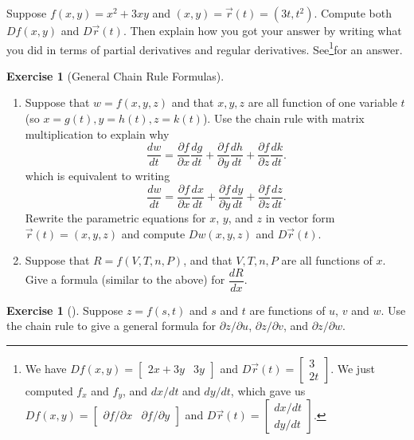 \documentclass[10pt,]{book}
\theoremstyle{plain}
\theoremstyle{definition}
\theoremstyle{definition}
\theoremstyle{definition}
\theoremstyle{definition}
\newtheorem{exploration}[project]{Exercise}
\theoremstyle{definition}
\numberwithin{equation}{section}
\newcommand{\amp}{&}
\begin{document}
Suppose \(f(x,y)=x^2+3xy\) and \((x,y) = \vec r(t) = (3t,t^2)\). Compute both \(Df(x,y)\) and \(D\vec r(t)\). Then explain how you got your answer by writing what you did in terms of partial derivatives and regular derivatives. See\footnote{We have \(Df(x,y) = \begin{bmatrix}2x+3y\amp 3y
\end{bmatrix}\) and \(D\vec r(t) = \begin{bmatrix}3\\2t
\end{bmatrix}\). We just computed \(f_x\) and \(f_y\), and \(dx/dt\) and \(dy/dt\), which gave us \(Df(x,y) = \begin{bmatrix}\partial f/\partial x\amp \partial f/\partial y
\end{bmatrix}\) and \(D\vec r(t) = \begin{bmatrix}dx/dt\\dy/dt
\end{bmatrix}\).\label{fn-4}}for an answer.%
\begin{exploration}[General Chain Rule Formulas]\label{exploration-157}
\leavevmode%
\begin{enumerate}[font=\bfseries,label=(\alph*),ref=\alph*]
\item\label{task-367} Suppose that \(w=f(x,y,z)\) and that \(x,y,z\) are all function of one variable \(t\) (so \(x=g(t), y=h(t), z=k(t)\)). Use the chain rule with matrix multiplication to explain why%
\begin{equation*}
\frac{dw}{dt} 
= \frac{\partial f}{\partial x}\frac{dg}{dt}+\frac{\partial f}{\partial y}\frac{dh}{dt}+\frac{\partial f}{\partial z}\frac{dk}{dt} 
.
\end{equation*}
which is equivalent to writing%
\begin{equation*}
\frac{dw}{dt} 
= \frac{\partial f}{\partial x}\frac{dx}{dt}+\frac{\partial f}{\partial y}\frac{dy}{dt}+\frac{\partial f}{\partial z}\frac{dz}{dt} 
.
\end{equation*}
Rewrite the parametric equations for \(x\), \(y\), and \(z\) in vector form \(\vec r(t) = (x,y,z)\) and compute \(Dw(x,y,z)\) and \(D\vec r(t)\).%
%
\item\label{task-368} Suppose that \(R=f(V,T,n,P)\), and that \(V,T,n,P\) are all functions of \(x\).  Give a formula (similar to the above) for \(\dfrac{dR}{dx}.\)%
\end{enumerate}
\end{exploration}
\begin{exploration}[]\label{exploration-158}
\larsonfive{ } Suppose \(z=f(s,t)\) and \(s\) and \(t\) are functions of \(u\), \(v\) and \(w\). Use the chain rule to give a general formula for \(\partial z/\partial u\), \(\partial z/\partial v\), and \(\partial z/\partial w\).%
\end{exploration}
\end{document}
